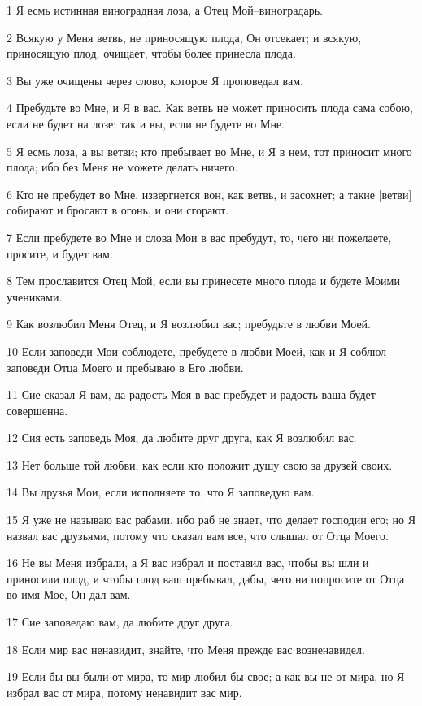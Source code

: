 \par 1 Я есмь истинная виноградная лоза, а Отец Мой--виноградарь.
\par 2 Всякую у Меня ветвь, не приносящую плода, Он отсекает; и всякую, приносящую плод, очищает, чтобы более принесла плода.
\par 3 Вы уже очищены через слово, которое Я проповедал вам.
\par 4 Пребудьте во Мне, и Я в вас. Как ветвь не может приносить плода сама собою, если не будет на лозе: так и вы, если не будете во Мне.
\par 5 Я есмь лоза, а вы ветви; кто пребывает во Мне, и Я в нем, тот приносит много плода; ибо без Меня не можете делать ничего.
\par 6 Кто не пребудет во Мне, извергнется вон, как ветвь, и засохнет; а такие [ветви] собирают и бросают в огонь, и они сгорают.
\par 7 Если пребудете во Мне и слова Мои в вас пребудут, то, чего ни пожелаете, просите, и будет вам.
\par 8 Тем прославится Отец Мой, если вы принесете много плода и будете Моими учениками.
\par 9 Как возлюбил Меня Отец, и Я возлюбил вас; пребудьте в любви Моей.
\par 10 Если заповеди Мои соблюдете, пребудете в любви Моей, как и Я соблюл заповеди Отца Моего и пребываю в Его любви.
\par 11 Сие сказал Я вам, да радость Моя в вас пребудет и радость ваша будет совершенна.
\par 12 Сия есть заповедь Моя, да любите друг друга, как Я возлюбил вас.
\par 13 Нет больше той любви, как если кто положит душу свою за друзей своих.
\par 14 Вы друзья Мои, если исполняете то, что Я заповедую вам.
\par 15 Я уже не называю вас рабами, ибо раб не знает, что делает господин его; но Я назвал вас друзьями, потому что сказал вам все, что слышал от Отца Моего.
\par 16 Не вы Меня избрали, а Я вас избрал и поставил вас, чтобы вы шли и приносили плод, и чтобы плод ваш пребывал, дабы, чего ни попросите от Отца во имя Мое, Он дал вам.
\par 17 Сие заповедаю вам, да любите друг друга.
\par 18 Если мир вас ненавидит, знайте, что Меня прежде вас возненавидел.
\par 19 Если бы вы были от мира, то мир любил бы свое; а как вы не от мира, но Я избрал вас от мира, потому ненавидит вас мир.
